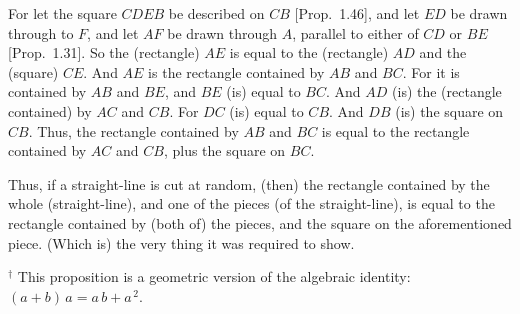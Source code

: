 \begin{Parallel}{}{}
{For let the square $CDEB$ be described on $CB$ [Prop.~1.46],
and let $ED$ be drawn through to $F$, and let $AF$ be
drawn through $A$, parallel to either of $CD$ or $BE$ [Prop.~1.31].
So the (rectangle) $AE$ is equal to the (rectangle) $AD$ and the (square) $CE$.
And $AE$ is the rectangle contained by $AB$ and $BC$.
For it is contained by $AB$ and $BE$, and $BE$ (is) equal to $BC$. And
$AD$ (is) the (rectangle contained) by $AC$ and $CB$. For $DC$
(is) equal to $CB$. And $DB$ (is) the square on $CB$. Thus, the rectangle
contained by $AB$ and $BC$ is equal to the rectangle contained by $AC$ and
$CB$, plus the square on $BC$.

Thus, if a straight-line is cut at random, (then) the rectangle contained by the
whole (straight-line),  and one of the pieces (of the straight-line),
is equal to the rectangle contained by (both of) the pieces, and the square on
the aforementioned piece. (Which is) the very thing it was required
to show.}
\end{Parallel}
{\footnotesize \noindent$^\dag$ This proposition is a geometric version
of the algebraic identity: $(a+b)\,a = a\,b + a^{\,2}$.}

